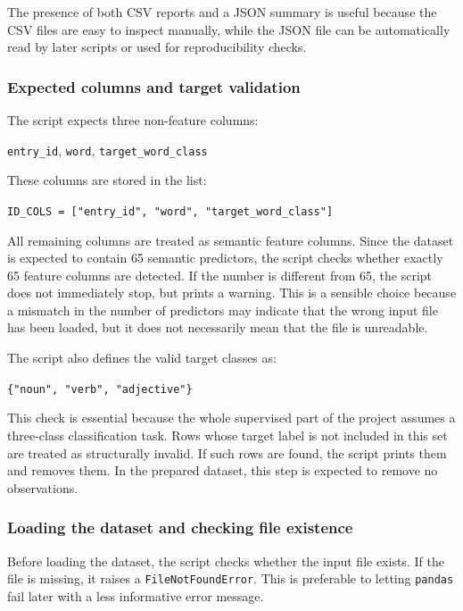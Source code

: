 \documentclass{ipgpmaster}
\begin{document}
The presence of both CSV reports and a JSON summary is useful because the CSV files are easy to inspect manually, while the JSON file can be automatically read by later scripts or used for reproducibility checks.

\subsubsection{Expected columns and target validation}

The script expects three non-feature columns:

\begin{center}
\texttt{entry\_id}, \texttt{word}, \texttt{target\_word\_class}
\end{center}

These columns are stored in the list:

\begin{center}
\texttt{ID\_COLS = ["entry\_id", "word", "target\_word\_class"]}
\end{center}

All remaining columns are treated as semantic feature columns. Since the dataset is expected to contain 65 semantic predictors, the script checks whether exactly 65 feature columns are detected. If the number is different from 65, the script does not immediately stop, but prints a warning. This is a sensible choice because a mismatch in the number of predictors may indicate that the wrong input file has been loaded, but it does not necessarily mean that the file is unreadable.

The script also defines the valid target classes as:

\begin{center}
\texttt{\{"noun", "verb", "adjective"\}}
\end{center}

This check is essential because the whole supervised part of the project assumes a three-class classification task. Rows whose target label is not included in this set are treated as structurally invalid. If such rows are found, the script prints them and removes them. In the prepared dataset, this step is expected to remove no observations.

\subsubsection{Loading the dataset and checking file existence}

Before loading the dataset, the script checks whether the input file exists. If the file is missing, it raises a \texttt{FileNotFoundError}. This is preferable to letting \texttt{pandas} fail later with a less informative error message.
\end{document}
